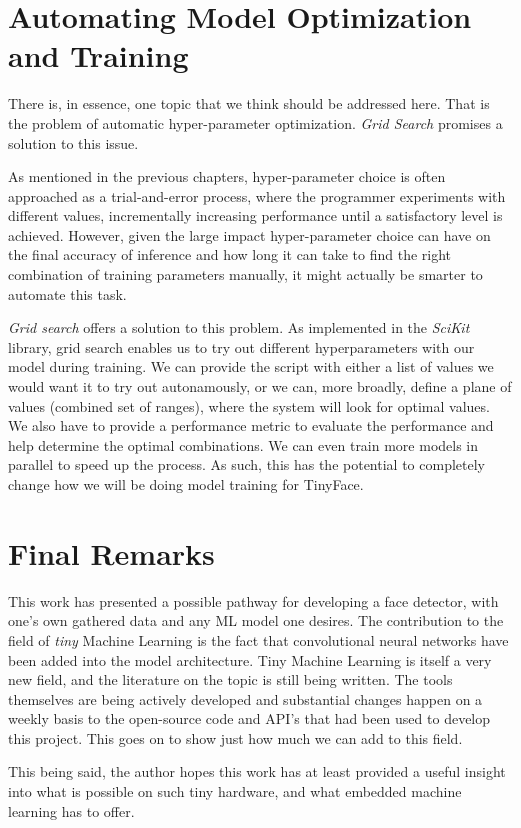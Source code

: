 \section{Automating Model Optimization and Training}
There is, in essence, one topic that we think should be addressed here. That is the problem of automatic hyper-parameter optimization. \textit{Grid Search} promises a solution to this issue. \par
As mentioned in the previous chapters, hyper-parameter choice is often approached as a trial-and-error process, where the programmer experiments with different values, incrementally increasing performance until a satisfactory level is achieved. However, given the large impact hyper-parameter choice can have on the final accuracy of inference and how long it can take to find the right combination of training parameters manually, it might actually be smarter to automate this task. \par
\textit{Grid search} offers a solution to this problem. \cite{scikit_grid_search} As implemented in the \textit{SciKit} library, grid search enables us to try out different hyperparameters with our model during training. We can provide the script with either a list of values we would want it to try out autonamously, or we can, more broadly, define a plane of values (combined set of ranges), where the system will look for optimal values. We also have to provide a performance metric to evaluate the performance and help determine the optimal combinations. We can even train more models in parallel to speed up the process. As such, this has the potential to completely change how we will be doing model training for TinyFace.
\section{Final Remarks}
This work has presented a possible pathway for developing a face detector, with one's own gathered data and any ML model one desires. The contribution to the field of \textit{tiny} Machine Learning is the fact that convolutional neural networks have been added into the model architecture. Tiny Machine Learning is itself a very new field, and the literature on the topic is still being written. The tools themselves are being actively developed and substantial changes happen on a weekly basis to the open-source code and API's that had been used to develop this project. This goes on to show just how much we can add to this field. \par
This being said, the author hopes this work has at least provided a useful insight into what is possible on such tiny hardware, and what embedded machine learning has to offer.